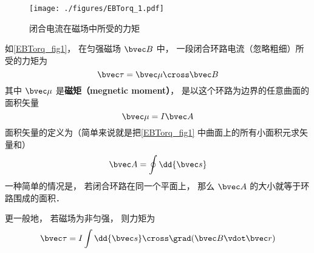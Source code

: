 
\begin{figure}[ht]
\centering
\texttt{[image: ./figures/EBTorq\_1.pdf]}
\caption{闭合电流在磁场中所受的力矩} \label{EBTorq_fig1}
\end{figure}

如\autoref{EBTorq_fig1}， 在匀强磁场 $\bvec B$ 中， 一段闭合环路电流（忽略粗细）所受的力矩为
\begin{equation}\label{EBTorq_eq2}
\bvec \tau = \bvec \mu \cross \bvec B
\end{equation}
其中 $\bvec \mu$ 是\textbf{磁矩（megnetic moment）}， 是以这个环路为边界的任意曲面的面积矢量
\begin{equation}
\bvec \mu = I \bvec A
\end{equation}
面积矢量的定义为（简单来说就是把\autoref{EBTorq_fig1} 中曲面上的所有小面积元求矢量和）
\begin{equation}
\bvec A = \oint \dd{\bvec s}
\end{equation}
一种简单的情况是， 若闭合环路在同一个平面上， 那么 $\bvec A$ 的大小就等于环路围成的面积．

更一般地， 若磁场为非匀强， 则力矩为
\begin{equation}\label{EBTorq_eq1}
\bvec \tau = I \int \dd{\bvec s}\cross\grad(\bvec B\vdot\bvec r)
\end{equation}

